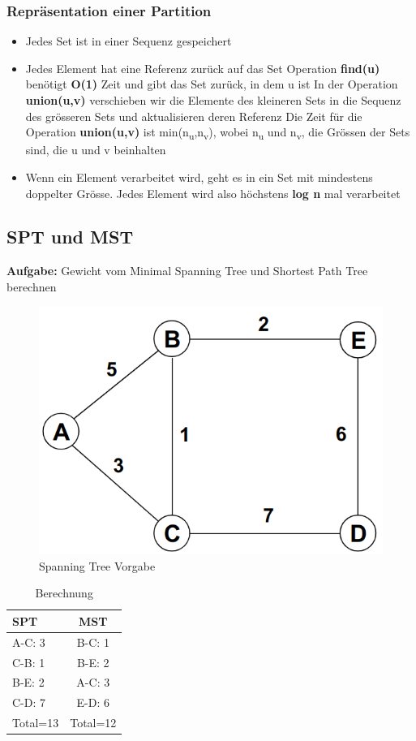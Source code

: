 \subsubsection{Repräsentation einer Partition}
\begin{itemize}
	\item Jedes Set ist in einer Sequenz gespeichert
	\item Jedes Element hat eine Referenz zurück auf das Set
		\subitem Operation \textbf{find(u)} benötigt \textbf{O(1)} Zeit und gibt das Set zurück, in dem u ist
		\subitem In der Operation \textbf{union(u,v)} verschieben wir die Elemente des kleineren Sets in die Sequenz des grösseren Sets und aktualisieren deren Referenz
		\subitem Die Zeit für die Operation \textbf{union(u,v)} ist min(n\textsubscript{u},n\textsubscript{v}), wobei n\textsubscript{u} und n\textsubscript{v}, die Grössen der Sets sind, die u und v beinhalten
	\item Wenn ein Element verarbeitet wird, geht es in ein Set mit mindestens doppelter Grösse. Jedes Element wird also höchstens \textbf{log n} mal verarbeitet
\end{itemize}

\subsection{SPT und MST}
\textbf{Aufgabe:} Gewicht vom Minimal Spanning Tree und Shortest Path Tree berechnen
\begin{figure}[h!]
	\centering
	\includegraphics[width=0.4\linewidth]{images/vorgegebenerspanningtree}
	\caption{Spanning Tree Vorgabe}
	\label{fig:spanningtreevorgabe}
\end{figure}

\begin{table}[h]
	\centering
	\begin{tabu} to \linewidth {l c}
		\toprule
		SPT & MST \\
		\midrule
		A-C: 3 & B-C: 1\\
		C-B: 1 & B-E: 2\\
		B-E: 2 & A-C: 3\\
		C-D: 7 & E-D: 6\\
		Total=13 & Total=12\\
		\bottomrule
	\end{tabu}
	\caption{Berechnung}
\end{table}
\clearpage

